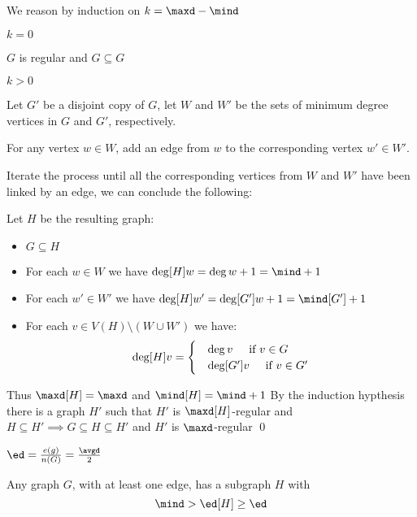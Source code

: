 \begin{prf}
    We reason by induction on $k = \maxd - \mind$

    \boldmath $k = 0$ \unboldmath

    $G$ is regular and $G \subseteq G$
    
    \boldmath $k > 0$ \unboldmath

    Let $G'$ be a disjoint copy of $G$, let $W$ and $W'$ be the sets of minimum degree vertices in $G$ and $G'$, respectively.

    For any vertex $w \in W$, add an edge from $w$ to the corresponding vertex $w' \in W'$.

    Iterate the process until all the corresponding vertices from $W$ and $W'$ have been linked by an edge, we can conclude the following:

    Let $H$ be the resulting graph:
    \begin{itemize}
        \item $G \subseteq H$
        \item For each $w \in W$ we have $\deg[H]{w} = \deg{w} + 1 = \mind + 1$
        \item For each $w' \in W'$ we have $\deg[H]{w'} = \deg[G']{w} + 1 = \mind[G'] + 1$
        \item For each $v \in V(H) \setminus (W \cup W')$ we have:
        \begin{equation*}
            \deg[H]{v} =
            \begin{cases}
                &\deg{v} \text{\hspace{5mm}if } v \in G\\
                &\deg[G']{v} \text{\hspace{5mm}if } v \in G'
            \end{cases}
        \end{equation*}
    \end{itemize}
    Thus $\maxd[H] = \maxd$ and $\mind[H] = \mind + 1$
    By the induction hypthesis there is a graph $H'$ such that $H'$ is $\maxd[H]$-regular and $H \subseteq H' \implies G \subseteq H \subseteq H'$ and $H'$ is $\maxd$-regular \qed
\end{prf}
\begin{definition}
    $\ed = \frac{e(g)}{n(G)} = \frac{\avgd}{2}$
\end{definition}
\begin{pipo}
    Any graph $G$, with at least one edge, has a subgraph $H$ with
    \begin{equation*}
        \mind > \ed[H] \geq \ed
    \end{equation*}
\end{pipo}
